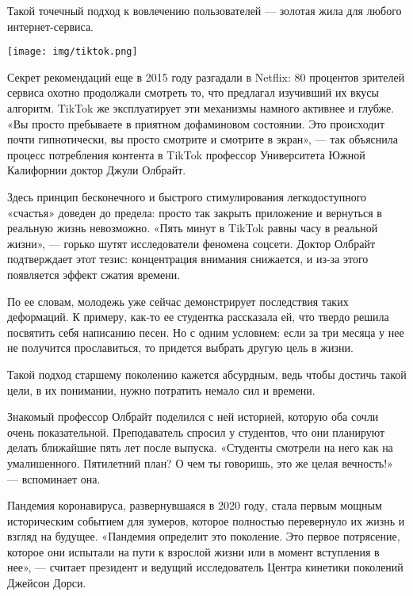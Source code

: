 \begin{fancyquotes}
    Такой точечный подход к вовлечению пользователей — золотая жила для любого интернет-сервиса.
\end{fancyquotes}

\begin{center}
    \texttt{[image: img/tiktok.png]}
\end{center}

Секрет рекомендаций еще в 2015 году разгадали в Netflix: 80 процентов зрителей сервиса охотно продолжали смотреть то, что предлагал изучивший их вкусы алгоритм. TikTok же эксплуатирует эти механизмы намного активнее и глубже. «Вы просто пребываете в приятном дофаминовом состоянии. Это происходит почти гипнотически, вы просто смотрите и смотрите в экран», — так объяснила процесс потребления контента в TikTok профессор Университета Южной Калифорнии доктор Джули Олбрайт.

Здесь принцип бесконечного и быстрого стимулирования легкодоступного «счастья» доведен до предела: просто так закрыть приложение и вернуться в реальную жизнь невозможно. «Пять минут в TikTok равны часу в реальной жизни», — горько шутят исследователи феномена соцсети. Доктор Олбрайт подтверждает этот тезис: концентрация внимания снижается, и из-за этого появляется эффект сжатия времени.

По ее словам, молодежь уже сейчас демонстрирует последствия таких деформаций. К примеру, как-то ее студентка рассказала ей, что твердо решила посвятить себя написанию песен. Но с одним условием: если за три месяца у нее не получится прославиться, то придется выбрать другую цель в жизни.

\begin{fancyquotes}
    Такой подход старшему поколению кажется абсурдным, ведь чтобы достичь такой цели, в их понимании, нужно потратить немало сил и времени.
\end{fancyquotes}

Знакомый профессор Олбрайт поделился с ней историей, которую оба сочли очень показательной. Преподаватель спросил у студентов, что они планируют делать ближайшие пять лет после выпуска. «Студенты смотрели на него как на умалишенного. Пятилетний план? О чем ты говоришь, это же целая вечность!» — вспоминает она.

Пандемия коронавируса, развернувшаяся в 2020 году, стала первым мощным историческим событием для зумеров, которое полностью перевернуло их жизнь и взгляд на будущее. «Пандемия определит это поколение. Это первое потрясение, которое они испытали на пути к взрослой жизни или в момент вступления в нее», — считает президент и ведущий исследователь Центра кинетики поколений Джейсон Дорси.

